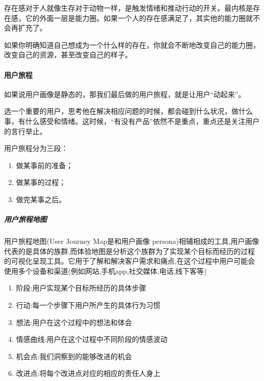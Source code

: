 \documentclass[letterpaper,11pt,english]{sphinxmanual}
\begin{document}
存在感对于人就像生存对于动物一样，是触发情绪和推动行动的开关。最内核是存在感，它的外面一层是能力圈。如果一个人的存在感满足了，其实他的能力圈就不会再扩充了。

如果你明确知道自己想成为一个什么样的存在，你就会不断地改变自己的能力圈，改变自己的资源，甚至改变自己的样子。


\paragraph{用户旅程}
\label{\detokenize{chapter_skill/users_analysis:id10}}
如果说用户画像是静态的，那我们最后做的用户旅程，就是让用户“动起来”。

选一个重要的用户，思考他在解决相应问题的时候，都会碰到什么状况，做什么事，有什么感受和情绪。这时候，“有没有产品”依然不是重点，重点还是关注用户的言行举止。

用户旅程分为三段：
\begin{enumerate}
%
\item {} 
做某事前的准备；

\item {} 
做某事的过程；

\item {} 
做完某事之后。

\end{enumerate}


\subparagraph{用户旅程地图}
\label{\detokenize{chapter_skill/users_analysis:id11}}
用户旅程地图(User Journey Map是和用户画像
persona)相辅相成的工具,用户画像代表的是具体的族群,而体验地图是分析这个族群为了实现某个目标而经历的过程的可视化呈现工具。它用于了解和解决客户需求和痛点,在这个过程中用户可能会使用多个设备和渠道(例如网站,手机app,社交媒体,电话,线下客等)
\begin{enumerate}
%
\item {} 
阶段:用户实现某个目标所经历的具体步骤

\item {} 
行动:每一个步骤下用户所产生的具体行为习惯

\item {} 
想法:用户在这个过程中的想法和体会

\item {} 
情感曲线:用户在这个过程中不同阶段的情感波动

\item {} 
机会点:我们洞察到的能够改进的机会

\item {} 
改进点:将每个改进点对应的相应的责任人身上

\end{enumerate}
\end{document}
